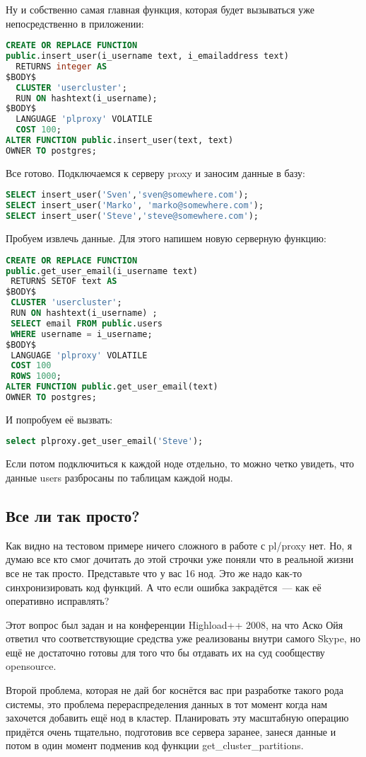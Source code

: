 Ну и собственно самая главная функция, которая будет вызываться уже непосредственно в приложении:
\begin{lstlisting}[language=SQL,label=lst:plproxy10,caption=Настройка]
CREATE OR REPLACE FUNCTION
public.insert_user(i_username text, i_emailaddress text)
  RETURNS integer AS
$BODY$
  CLUSTER 'usercluster';
  RUN ON hashtext(i_username);
$BODY$
  LANGUAGE 'plproxy' VOLATILE
  COST 100;
ALTER FUNCTION public.insert_user(text, text)
OWNER TO postgres;
\end{lstlisting}

Все готово. Подключаемся к серверу proxy и заносим данные в базу:
\begin{lstlisting}[language=SQL,label=lst:plproxy11,caption=Настройка]
SELECT insert_user('Sven','sven@somewhere.com');
SELECT insert_user('Marko', 'marko@somewhere.com');
SELECT insert_user('Steve','steve@somewhere.com');
\end{lstlisting}

Пробуем извлечь данные.
Для этого напишем новую серверную функцию:
\begin{lstlisting}[language=SQL,label=lst:plproxy12,caption=Настройка]
CREATE OR REPLACE FUNCTION
public.get_user_email(i_username text)
 RETURNS SETOF text AS
$BODY$
 CLUSTER 'usercluster';
 RUN ON hashtext(i_username) ;
 SELECT email FROM public.users
 WHERE username = i_username;
$BODY$
 LANGUAGE 'plproxy' VOLATILE
 COST 100
 ROWS 1000;
ALTER FUNCTION public.get_user_email(text)
OWNER TO postgres;
\end{lstlisting}

И попробуем её вызвать:
\begin{lstlisting}[language=SQL,label=lst:plproxy13,caption=Настройка]
select plproxy.get_user_email('Steve');
\end{lstlisting}

Если потом подключиться к каждой ноде отдельно, то можно четко увидеть, что данные users разбросаны по таблицам каждой ноды.

\subsection{Все ли так просто?}
Как видно на тестовом примере ничего сложного в работе с pl/proxy нет.
Но, я думаю все кто смог дочитать до этой строчки уже поняли что в реальной жизни все не так просто.
Представьте что у вас 16 нод. Это же надо как-то синхронизировать код функций. А что если ошибка закрадётся~---
как её оперативно исправлять?

Этот вопрос был задан и на конференции Highload++ 2008, на что Аско Ойя ответил что соответствующие средства
уже реализованы внутри самого Skype, но ещё не достаточно готовы для того что бы отдавать их на суд сообществу opensource.

Второй проблема, которая не дай бог коснётся вас при разработке такого рода системы, это проблема перераспределения данных
в тот момент когда нам захочется добавить ещё нод в кластер.
Планировать эту масштабную операцию придётся очень тщательно, подготовив все сервера заранее,
занеся данные и потом в один момент подменив код функции get\_cluster\_partitions.